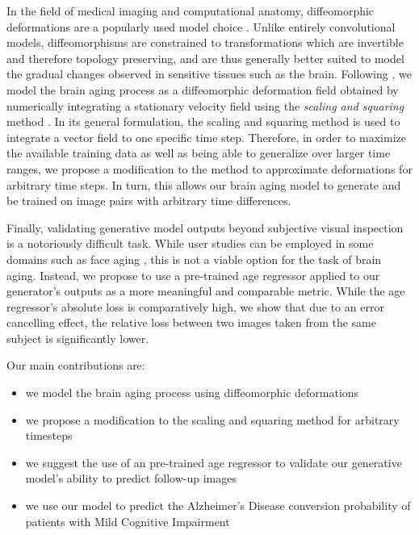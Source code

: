 In the field of medical imaging and computational anatomy, diffeomorphic deformations are a popularly used model choice \cite{beg2005computing} \cite{ashburner2007fast}. Unlike entirely convolutional models, diffeomorphisms are constrained to transformations which are invertible and therefore topology preserving, and are thus generally better suited to model the gradual changes observed in sensitive tissues such as the brain. Following \cite{dalca2018unsupervised}, we model the brain aging process as a diffeomorphic deformation field obtained by numerically integrating a stationary velocity field using the \textit{scaling and squaring} method \cite{arsigny2006log}. In its general formulation, the scaling and squaring method is used to integrate a vector field to one specific time step. Therefore, in order to maximize the available training data as well as being able to generalize over larger time ranges, we propose a modification to the method to approximate deformations for arbitrary time steps. In turn, this allows our brain aging model to generate and be trained on image pairs with arbitrary time differences. 

Finally, validating generative model outputs beyond subjective visual inspection is a notoriously difficult task. While user studies can be employed in some domains such as face aging \cite{palsson2018generative}, this is not a viable option for the task of brain aging. Instead, we propose to use a pre-trained age regressor applied to our generator's outputs as a more meaningful and comparable metric. While the age regressor's absolute loss is comparatively high, we show that due to an error cancelling effect, the relative loss between two images taken from the same subject is significantly lower.

Our main contributions are:

\begin{itemize}
	\item we model the brain aging process using diffeomorphic deformations%
	\item we propose a modification to the scaling and squaring method for arbitrary timesteps
	\item we suggest the use of an pre-trained age regressor to validate our generative model's ability to predict follow-up images
	\item we use our model to predict the Alzheimer's Disease conversion probability of patients with Mild Cognitive Impairment
\end{itemize}

